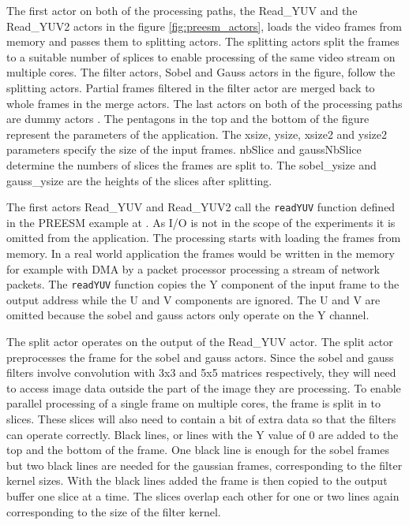 The first actor on both of the processing paths, the Read\_YUV and the Read\_YUV2 actors in the figure \ref{fig:preesm_actors}, loads the video frames from memory and passes them to splitting actors. The splitting actors split the frames to a suitable number of splices to enable processing of the same video stream on multiple cores. The filter actors, Sobel and Gauss actors in the figure, follow the splitting actors. Partial frames filtered in the filter actor are merged back to whole frames in the merge actors. The last actors on both of the processing paths are dummy actors . The pentagons in the top and the bottom of the figure represent the parameters of the application. The xsize, ysize, xsize2 and ysize2 parameters specify the size of the input frames. nbSlice and gaussNbSlice determine the numbers of slices the frames are split to. The sobel\_ysize and gauss\_ysize are the heights of the slices after splitting.

The first actors Read\_YUV and Read\_YUV2 call the \texttt{readYUV} function defined in the PREESM example at \cite{preesmtut}. As I/O is not in the scope of the experiments it is omitted from the application. The processing starts with loading the frames from memory. In a real world application the frames would be written in the memory for example with DMA by a packet processor processing a stream of network packets. The \texttt{readYUV} function copies the Y component of the input frame to the output address while the U and V components are ignored. The U and V are omitted because the sobel and gauss actors only operate on the Y channel. 

The split actor operates on the output of the Read\_YUV actor. The split actor preprocesses the frame for the sobel and gauss actors. Since the sobel and gauss filters involve convolution with 3x3 and 5x5 matrices respectively, they will need to access image data outside the part of the image they are processing. To enable parallel processing of a single frame on multiple cores, the frame is split in to slices. These slices will also need to contain a bit of extra data so that the filters can operate correctly. Black lines, or lines with the Y value of 0 are added to the top and the bottom of the frame. One black line is enough for the sobel frames but two black lines are needed for the gaussian frames, corresponding to the filter kernel sizes. With the black lines added the frame is then copied to the output buffer one slice at a time. The slices overlap each other for one or two lines again corresponding to the size of the filter kernel.

